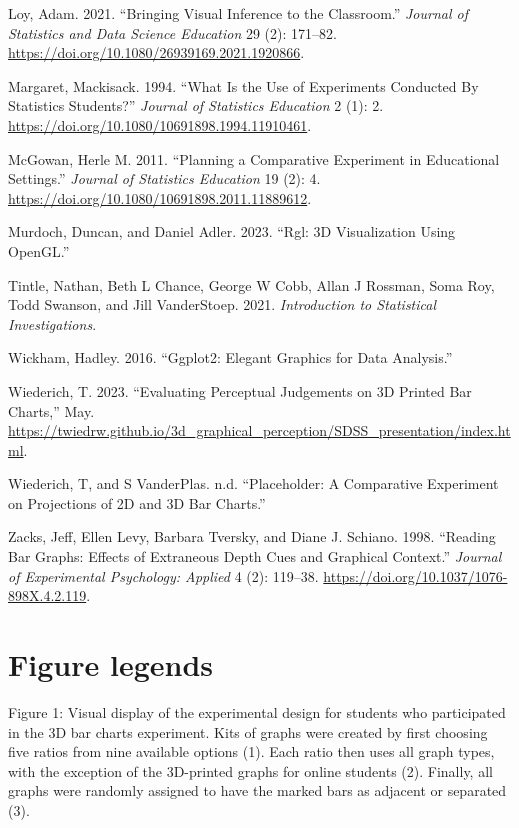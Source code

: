 \documentclass[
  12pt,
]{article}
\newlength{\cslhangindent}
\newenvironment{CSLReferences}[2] %
 {\begin{list}{}{%
  \setlength{\itemindent}{0pt}
  \setlength{\leftmargin}{0pt}
  \setlength{\parsep}{0pt}
  \ifodd #1
   \setlength{\leftmargin}{\cslhangindent}
   \setlength{\itemindent}{-1\cslhangindent}
  \fi
  \setlength{\itemsep}{#2\baselineskip}}}
 {\end{list}}
\begin{document}
\begin{CSLReferences}{1}{0}
Loy, Adam. 2021. {``Bringing Visual Inference to the Classroom.''}
\emph{Journal of Statistics and Data Science Education} 29 (2): 171--82.
\url{https://doi.org/10.1080/26939169.2021.1920866}.

Margaret, Mackisack. 1994. {``What Is the Use of Experiments Conducted
By Statistics Students?''} \emph{Journal of Statistics Education} 2 (1):
2. \url{https://doi.org/10.1080/10691898.1994.11910461}.

McGowan, Herle M. 2011. {``Planning a Comparative Experiment in
Educational Settings.''} \emph{Journal of Statistics Education} 19 (2):
4. \url{https://doi.org/10.1080/10691898.2011.11889612}.

Murdoch, Duncan, and Daniel Adler. 2023. {``Rgl: 3D Visualization Using
OpenGL.''}

Tintle, Nathan, Beth L Chance, George W Cobb, Allan J Rossman, Soma Roy,
Todd Swanson, and Jill VanderStoep. 2021. \emph{Introduction to
Statistical Investigations}.

Wickham, Hadley. 2016. {``Ggplot2: Elegant Graphics for Data
Analysis.''}

Wiederich, T. 2023. {``Evaluating Perceptual Judgements on 3D Printed
Bar Charts,''} May.
\url{https://twiedrw.github.io/3d_graphical_perception/SDSS_presentation/index.html}.

Wiederich, T, and S VanderPlas. n.d. {``Placeholder: A Comparative
Experiment on Projections of 2D and 3D Bar Charts.''}

Zacks, Jeff, Ellen Levy, Barbara Tversky, and Diane J. Schiano. 1998.
{``Reading Bar Graphs: Effects of Extraneous Depth Cues and Graphical
Context.''} \emph{Journal of Experimental Psychology: Applied} 4 (2):
119--38. \url{https://doi.org/10.1037/1076-898X.4.2.119}.

\end{CSLReferences}

\newpage

\section{Figure legends}\label{figure-legends}

Figure 1: Visual display of the experimental design for students who
participated in the 3D bar charts experiment. Kits of graphs were
created by first choosing five ratios from nine available options (1).
Each ratio then uses all graph types, with the exception of the
3D-printed graphs for online students (2). Finally, all graphs were
randomly assigned to have the marked bars as adjacent or separated (3).
\end{document}
